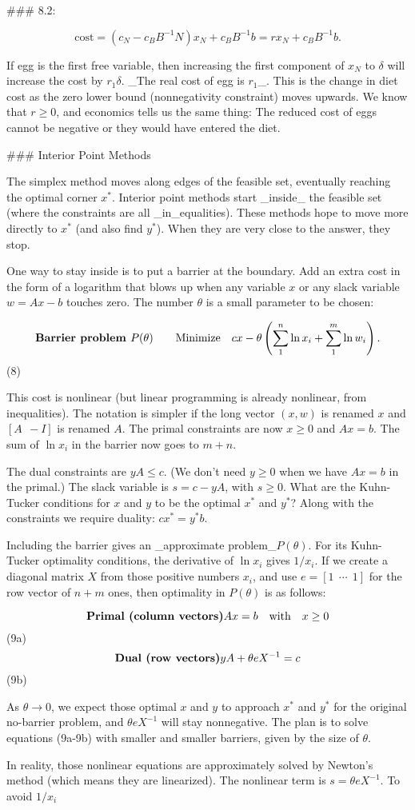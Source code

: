 

### 8.2:

\[\text{cost}=(c_{N}-c_{B}B^{-1}N)x_{N}+c_{B}B^{-1}b=rx_{N}+c_{B}B^{-1}b.\]

If egg is the first free variable, then increasing the first component of \(x_{N}\) to \(\delta\) will increase the cost by \(r_{1}\delta\). _The real cost of egg is \(r_{1}\)_. This is the change in diet cost as the zero lower bound (nonnegativity constraint) moves upwards. We know that \(r\geq 0\), and economics tells us the same thing: The reduced cost of eggs cannot be negative or they would have entered the diet.

### Interior Point Methods

The simplex method moves along edges of the feasible set, eventually reaching the optimal corner \(x^{*}\). Interior point methods start _inside_ the feasible set (where the constraints are all _in_equalities). These methods hope to move more directly to \(x^{*}\) (and also find \(y^{*}\)). When they are very close to the answer, they stop.

One way to stay inside is to put a barrier at the boundary. Add an extra cost in the form of a logarithm that blows up when any variable \(x\) or any slack variable \(w=Ax-b\) touches zero. The number \(\theta\) is a small parameter to be chosen:

\[\text{\bf Barrier problem }P(\theta)\qquad\text{Minimize}\quad cx-\theta \left(\sum_{1}^{n}\ln x_{i}+\sum_{1}^{m}\ln w_{i}\right).\] (8)

This cost is nonlinear (but linear programming is already nonlinear, from inequalities). The notation is simpler if the long vector \((x,w)\) is renamed \(x\) and \([A\ \ -I]\) is renamed \(A\). The primal constraints are now \(x\geq 0\) and \(Ax=b\). The sum of \(\ln x_{i}\) in the barrier now goes to \(m+n\).

The dual constraints are \(yA\leq c\). (We don't need \(y\geq 0\) when we have \(Ax=b\) in the primal.) The slack variable is \(s=c-yA\), with \(s\geq 0\). What are the Kuhn-Tucker conditions for \(x\) and \(y\) to be the optimal \(x^{*}\) and \(y^{*}\)? Along with the constraints we require duality: \(cx^{*}=y^{*}b\).

Including the barrier gives an _approximate problem_\(P(\theta)\). For its Kuhn-Tucker optimality conditions, the derivative of \(\ln x_{i}\) gives \(1/x_{i}\). If we create a diagonal matrix \(X\) from those positive numbers \(x_{i}\), and use \(e=[1\ \ \cdots\ \ 1]\) for the row vector of \(n+m\) ones, then optimality in \(P(\theta)\) is as follows:

\[\text{\bf Primal (column vectors)} Ax=b\quad\text{with}\quad x\geq 0\] (9a) \[\text{\bf Dual (row vectors)} yA+\theta eX^{-1}=c\] (9b)

As \(\theta\to 0\), we expect those optimal \(x\) and \(y\) to approach \(x^{*}\) and \(y^{*}\) for the original no-barrier problem, and \(\theta eX^{-1}\) will stay nonnegative. The plan is to solve equations (9a-9b) with smaller and smaller barriers, given by the size of \(\theta\).

In reality, those nonlinear equations are approximately solved by Newton's method (which means they are linearized). The nonlinear term is \(s=\theta eX^{-1}\). To avoid \(1/x_{i}\)